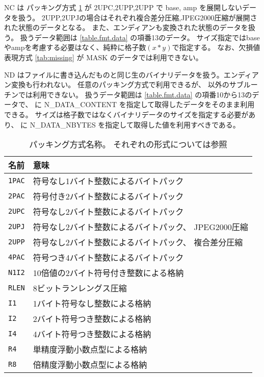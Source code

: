 NC は パッキング方式 \ref{tab:packing} が 2UPC,2UPP,2UPP で base, amp を展開しないデータを扱う。
2UPP,2UPJの場合はそれぞれ複合差分圧縮,JPEG2000圧縮が展開された状態のデータとなる。
また、エンディアンも変換された状態のデータを扱う。
扱うデータ範囲は \ref{table.fmt.data} の項番13のデータ。
サイズ指定ではbaseやampを考慮する必要はなく、純粋に格子数$(x*y)$で指定する。
なお、欠損値表現方式 \ref{tab:missing} が MASK のデータでは利用できない。

ND はファイルに書き込んだものと同じ生のバイナリデータを扱う。エンディアン変換も行われない。
任意のパッキング方式で利用できるが、 以外のサブルーチンでは利用できない。
扱うデータ範囲は \ref{table.fmt.data} の項番10から13のデータで、
 に N\_DATA\_CONTENT を指定して取得したデータをそのまま利用できる。
サイズは格子数ではなくバイナリデータのサイズを指定する必要があり、
 に N\_DATA\_NBYTES を指定して取得した値を利用すべきである。

\begin{table}[htp]
\begin{center}
\begin{tabular}{l|l}
\hline
名前 & 意味 \\
\hline
{\tt 1PAC} & 符号なし1バイト整数によるバイトパック \\
{\tt 2PAC} & 符号付き2バイト整数によるバイトパック \\
{\tt 2UPC} & 符号なし2バイト整数によるバイトパック\\
{\tt 2UPJ} & 符号なし2バイト整数によるバイトパック、 JPEG2000圧縮\\
{\tt 2UPP} & 符号なし2バイト整数によるバイトパック、 複合差分圧縮\\
{\tt 4PAC} & 符号つき4バイト整数によるバイトパック \\
{\tt N1I2} & 10倍値の2バイト符号付き整数による格納 \\
{\tt RLEN} & 8ビットランレングス圧縮 \\
{\tt I1  } & 1バイト符号なし整数による格納 \\
{\tt I2  } & 2バイト符号つき整数による格納 \\
{\tt I4  } & 4バイト符号つき整数による格納 \\
{\tt R4  } & 単精度浮動小数点型による格納 \\
{\tt R8  } & 倍精度浮動小数点型による格納 \\
\hline
\end{tabular}
\caption{パッキング方式名称。
それぞれの形式については参照}
\label{tab:packing}
\end{center}
\end{table}

